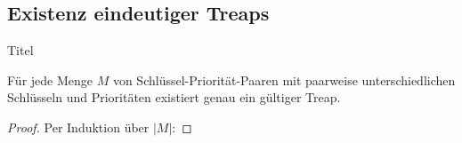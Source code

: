 \documentclass[t]{beamer}
\theoremstyle{plain}
\begin{document}
\subsection{Existenz eindeutiger Treaps}
\begin{frame}{Titel}
    \begin{Satz}
        Für jede Menge $M$ von Schlüssel-Priorität-Paaren mit paarweise unterschiedlichen Schlüsseln und Prioritäten existiert genau ein gültiger Treap.
    \end{Satz}
    \begin{proof}
        Per Induktion über $\left|M\right|$:
\end{proof}
\end{frame}
\end{document}
